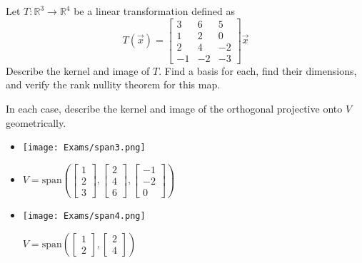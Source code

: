 \documentclass[english,9pt,xcolor=dvipsnames,notheorems]{beamer}
\newcommand{\spn}{\mathrm{span}}
\begin{document}
\begin{frame}
  \vspace{-5 cm}
 
 \hline
 \vspace{1 cm}   
Let $T:\mathbb R^3\to \mathbb R^4$ be a linear transformation defined as $$T(\vec x)=\begin{bmatrix}
3 &6& 5\\
1&2&0\\
2&4&-2\\
-1&-2&-3
    \end{bmatrix}\vec x$$
    Describe the kernel and image of $T$. Find a basis for each, find their dimensions, and verify the rank nullity theorem for this map. 
\end{frame}
\begin{frame}
    
\end{frame}


\begin{frame}
 \vspace{-4 cm}
\PullLS[ch5-VG-kerim]
 
 \hline
 \vspace{1 cm}
In each case, describe the kernel and image of the orthogonal projective onto $V$ geometrically. 

\begin{itemize}
   \item \texttt{[image: Exams/span3.png]} 
 \vspace{1 cm}

 
   \item $V=\spn(\begin{bmatrix}1\\2\\3\end{bmatrix}, \begin{bmatrix}2\\4\\6\end{bmatrix}, \begin{bmatrix}-1\\-2\\0\end{bmatrix})$
 \vspace{1 cm}

\end{itemize}
    
\end{frame}

\begin{frame}
 \vspace{-4 cm}
 \begin{itemize}
   \item  \texttt{[image: Exams/span4.png]} 
 \vspace{3 cm}
 
   \iteme  $V=\spn(\begin{bmatrix}1\\2\end{bmatrix}, \begin{bmatrix}2\\4\end{bmatrix})$
\end{itemize}
    
\end{frame}
\end{document}
